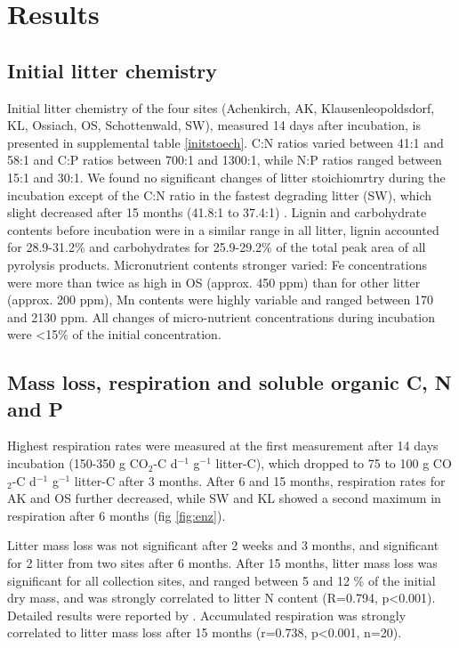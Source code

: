 \section*{Results}
\subsection*{Initial litter chemistry}
Initial litter chemistry of the four sites (Achenkirch, AK, Klausenleopoldsdorf, KL, Ossiach, OS, Schottenwald, SW), measured 14 days after incubation, is presented in supplemental table \ref{initstoech}. C:N ratios varied between 41:1 and 58:1 and C:P ratios between 700:1 and 1300:1, while N:P ratios ranged between 15:1 and 30:1. We found no significant changes of litter stoichiomrtry during the incubation except  of the C:N ratio in the fastest degrading litter (SW), which slight decreased after 15 months (41.8:1 to 37.4:1) . Lignin and carbohydrate contents before incubation were in a similar range in all litter, lignin accounted for 28.9-31.2\% and carbohydrates for 25.9-29.2\% of the total peak area of all pyrolysis products. Micronutrient contents stronger varied: Fe concentrations were more than twice as high in OS (approx. 450 ppm) than for other litter (approx. 200 ppm), Mn contents were highly variable and ranged between 170 and 2130 ppm. All changes of micro-nutrient concentrations during 
incubation were \textless 15\% of the initial concentration. 

\subsection*{Mass loss, respiration and soluble organic C, N and P}

Highest respiration rates were measured at the first measurement after 14 days incubation (150-350 \textmu g CO$_2$-C d$^{-1}$ g$^{-1}$ litter-C), which dropped to 75 to 100 \textmu g CO$_2$-C d$^{-1}$ g$^{-1}$ litter-C after 3 months. After 6 and 15 months, respiration rates for AK and OS further decreased, while SW and KL showed a second maximum in respiration after 6 months (fig \ref{fig:enz}). 

Litter mass loss was not significant after 2 weeks and 3 months, and significant for 2 litter from two sites after 6 months. After 15 months, litter mass loss was significant for all collection sites, and ranged between 5 and 12 \% of the initial dry mass, and was strongly correlated to litter N content (R=0.794, p\textless 0.001). Detailed results were reported by \cite{Mooshammer2011}. Accumulated respiration was strongly correlated to litter mass loss after 15 months (r=0.738, p\textless 0.001, n=20).

